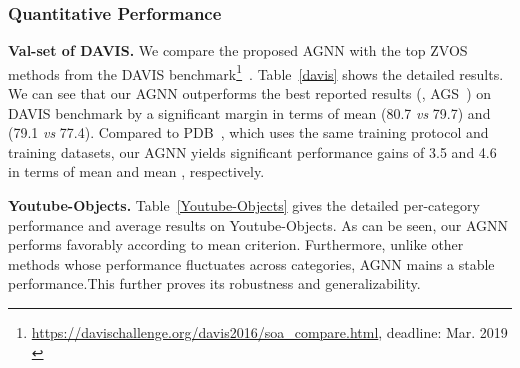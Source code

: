 \documentclass[10pt,twocolumn,letterpaper]{article}
\begin{document}
\subsubsection{Quantitative Performance}\label{sec:exqUVOS}
\vspace*{-4pt}
\noindent\textbf{Val-set of DAVIS.}
We compare the proposed AGNN with the top ZVOS methods from the DAVIS benchmark\footnote{\scriptsize{\url{https://davischallenge.org/davis2016/soa_compare.html}, deadline: Mar. 2019 }\label{web}}~\cite{perazzi2016benchmark}. Table~\ref{davis} shows the detailed results. We can see that our AGNN outperforms the best reported results (\ie, AGS~\cite{wang2019learning}) on DAVIS benchmark by a significant margin in terms of mean  (80.7 \textit{vs} 79.7) and  (79.1 \textit{vs} 77.4). Compared to  PDB~\cite{Song_2018_ECCV}, which uses the same training protocol and training datasets, our AGNN yields significant performance gains of 3.5 and 4.6 in terms of mean  and mean , respectively.









\noindent\textbf{Youtube-Objects.} Table~\ref{Youtube-Objects} gives the detailed per-category performance and average results on Youtube-Objects. As can be seen, our AGNN performs favorably according to mean  criterion. Furthermore, unlike other methods whose performance fluctuates across categories, AGNN mains a stable performance.This further proves its robustness and generalizability.
\end{document}
